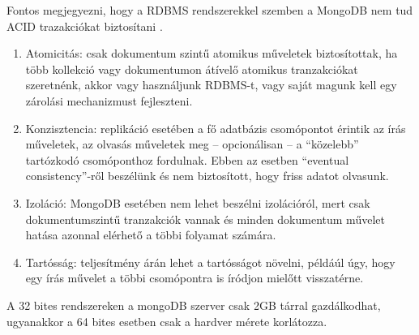 Fontos megjegyezni, hogy a RDBMS rendszerekkel szemben a MongoDB nem tud ACID trazakciókat biztosítani \cite{acidref}. 
\begin{enumerate}
\item{Atomicitás}: csak dokumentum szintű atomikus műveletek biztosítottak, ha több kollekció vagy dokumentumon átívelő atomikus tranzakciókat szeretnénk, akkor vagy használjunk RDBMS-t, vagy saját magunk kell egy zárolási mechanizmust fejleszteni.
\item{Konzisztencia}: replikáció esetében a fő adatbázis csomópontot érintik az írás műveletek, az olvasás műveletek meg -- opcionálisan --  a ``közelebb'' tartózkodó csomóponthoz fordulnak. Ebben az esetben ``eventual consistency''-ről beszélünk és nem biztosított, hogy friss adatot olvasunk.  
\item{Izoláció}: MongoDB esetében nem lehet beszélni izolációról, mert csak dokumentumszintű tranzakciók vannak és minden dokumentum művelet hatása azonnal elérhető a többi folyamat számára. 
\item{Tartósság}: teljesítmény árán lehet a tartósságot növelni, példáúl úgy, hogy egy írás művelet a többi csomópontra is íródjon mielőtt visszatérne.
\end{enumerate}


A 32 bites rendszereken a mongoDB szerver csak 2GB tárral gazdálkodhat, ugyanakkor a 64 bites esetben csak a hardver mérete korlátozza.





